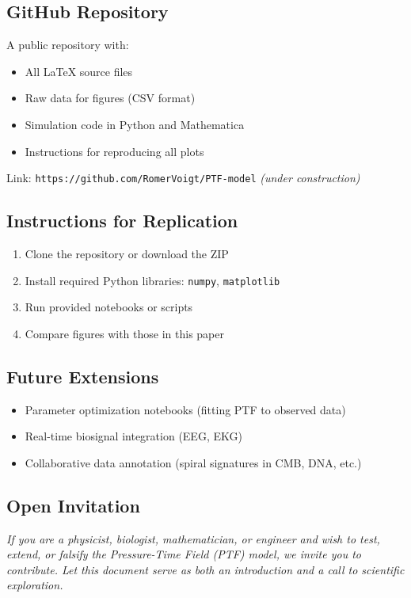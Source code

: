 \documentclass[a4paper,12pt]{article}
\begin{document}
\subsection{GitHub Repository}

A public repository with:
\begin{itemize}
    \item All LaTeX source files
    \item Raw data for figures (CSV format)
    \item Simulation code in Python and Mathematica
    \item Instructions for reproducing all plots
\end{itemize}

\noindent
Link: \texttt{https://github.com/RomerVoigt/PTF-model} \quad \textit{(under construction)}

\subsection{Instructions for Replication}

\begin{enumerate}
    \item Clone the repository or download the ZIP
    \item Install required Python libraries: \texttt{numpy}, \texttt{matplotlib}
    \item Run provided notebooks or scripts
    \item Compare figures with those in this paper
\end{enumerate}

\subsection{Future Extensions}

\begin{itemize}
    \item Parameter optimization notebooks (fitting PTF to observed data)
    \item Real-time biosignal integration (EEG, EKG)
    \item Collaborative data annotation (spiral signatures in CMB, DNA, etc.)
\end{itemize}

\subsection{Open Invitation}

\textit{If you are a physicist, biologist, mathematician, or engineer and wish to test, extend, or falsify the Pressure-Time Field (PTF) model, we invite you to contribute. Let this document serve as both an introduction and a call to scientific exploration.}
\end{document}
